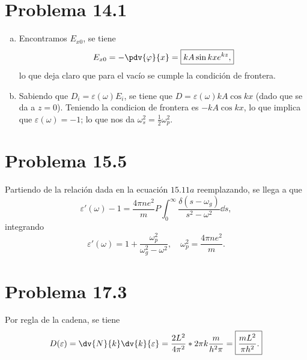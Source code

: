 \vspace{0.5cm}


\section*{Problema 14.1}
\begin{enumerate}[a)]
	\item Encontramos $E_{x0}$, se tiene
		$$ E_{x0} = -\pdv{\varphi}{x} = \boxed{ kA\sin{kx} e^{kz}, } $$
		lo que deja claro que para el vacío se cumple la condición de frontera.
	\item Sabiendo que $D_i = \varepsilon (\omega) E_i$, se tiene que $D = \varepsilon (\omega) kA \cos{kx}$ (dado que se da a $z = 0$). Teniendo la condicion de frontera es $-kA\cos{kx}$, lo que implica que $\varepsilon (\omega) = -1$; lo que nos da $\omega _s ^2 = \frac{1}{2} \omega _p ^2$.
\end{enumerate}
	
\section*{Problema 15.5}
Partiendo de la relación dada en la ecuación $15.11a$ reemplazando, se llega a que
	$$ \varepsilon '(\omega) - 1 = \frac{4\pi ne^2}{m} P \int _0 ^\infty \frac{\delta (s - \omega _g)}{s^2 - \omega ^2} \dd{s},  $$
integrando
	$$ \varepsilon '(\omega) = \boxed{ 1 + \frac{\omega _p ^2}{\omega _g ^2 - \omega ^2}, \quad \omega _p ^2 = \frac{4\pi ne^2}{m}. } $$


\section*{Problema 17.3}
Por regla de la cadena, se tiene
	$$ D(\varepsilon) = \dv{N}{k} \dv{k}{\varepsilon} = \frac{2L^2}{4\pi ^2} *2\pi k \frac{m}{h^2 \pi} = \boxed{ \frac{mL^2}{\pi h^2}. } $$






















